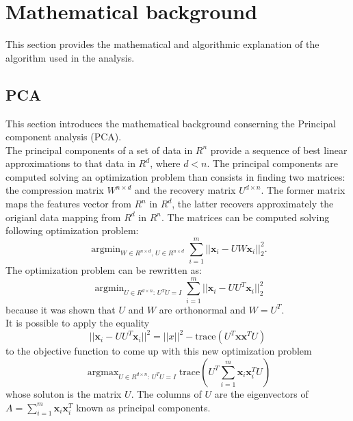 \documentclass{article}
\DeclareMathOperator*{\argmax}{argmax}
\DeclareMathOperator*{\argmin}{argmin}
\begin{document}
\section{Mathematical background}
This section provides the mathematical and algorithmic explanation of the algorithm used in the analysis.
\subsection{PCA}
This section introduces the mathematical background conserning the Principal component analysis (PCA).\\
The principal components of a set of data in $R^n$ provide a sequence of best linear approximations to that data in $R^d$, where $d < n$.
The principal components are computed solving an optimization problem than consists in finding two matrices: the compression matrix $W^{n \times d}$ and  the recovery matrix $U^{d \times n}$. The former matrix maps the features vector from $R^n$ in $R^d$, the latter recovers approximately the origianl data mapping from $R^d$ in $R^n$.
The matrices can be computed solving following optimization problem:
\begin{equation}
\argmin_{W \in R^{n \times d}  , \, U \in R^{n \times d}} \sum_{i = 1}^m ||\textbf{x}_i -UW \textbf{x}_i ||_2^2.
\end{equation}
The optimization problem can be rewritten as:
\begin{equation}
\argmin_{U \in R^{d \times n}: \, U^TU=I} \sum_{i = 1}^m ||\textbf{x}_i -UU^T \textbf{x}_i ||_2^2
\end{equation}
because it was shown that $U$ and $W$ are orthonormal and $W = U^T$. \\
It is possible to apply the equality
\begin{equation}
||\textbf{x}_i -UU^T \textbf{x}_i ||^2 = ||x||^2 - \text{trace}(U^T\textbf{x}\textbf{x}^TU)
\end{equation}
to the objective function to come up with this new optimization problem
\begin{equation}
\argmax_{U \in R^{d \times n}: \, U^TU=I} \text{trace} (U^T\sum_{i=1}^m\textbf{x}_i\textbf{x}_i^T U)
\end{equation}
whose soluton is the matrix $U$. The columns of $U$ are the eigenvectors of $A = \sum_{i=1}^m\textbf{x}_i\textbf{x}_i^T$ known as principal components. \cite{book1} \cite{book2}
\end{document}
